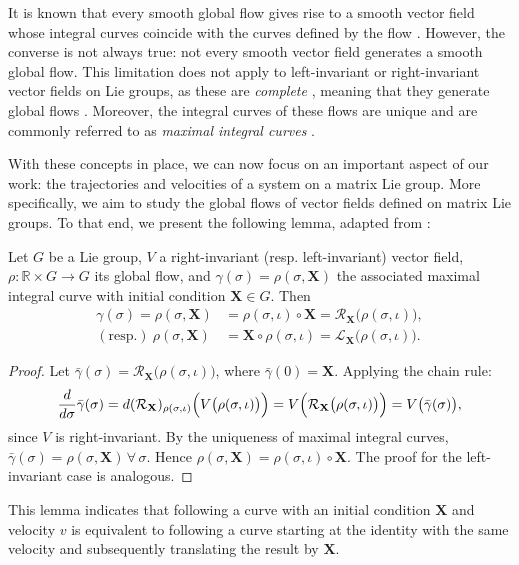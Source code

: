 It is known that every smooth global flow gives rise to a smooth vector field whose integral curves coincide with the curves defined by the flow \citep[p. 211]{Lee2012}. However, the converse is not always true: not every smooth vector field generates a smooth global flow. This limitation does not apply to left-invariant or right-invariant vector fields on Lie groups, as these are \emph{complete} \citep[p. 570]{Gallier2020}, meaning that they generate global flows \citep[p. 215]{Lee2012}. Moreover, the integral curves of these flows are unique \citep[p. 18]{Duistermaat2012} and are commonly referred to as \emph{maximal integral curves} \citep[p. 570]{Gallier2020}.

With these concepts in place, we can now focus on an important aspect of our work: the trajectories and velocities of a system on a matrix Lie group. More specifically, we aim to study the global flows of vector fields defined on matrix Lie groups. To that end, we present the following lemma, adapted from \citet[p. 570]{Gallier2020}:
\begin{lemma}\label{lemma:lie-group-flow}
    Let $G$ be a Lie group, $V$ a right-invariant (resp. left-invariant) vector field, $\rho:\mathbb{R}\times G\to G$ its global flow, and $\gamma(\sigma)=\rho(\sigma, \mathbf{X})$ the associated maximal integral curve with initial condition $\mathbf{X}\in G$. Then
    \begin{align*}
        \gamma(\sigma) = \rho(\sigma, \mathbf{X}) &=  \rho(\sigma, \iota)\circ\mathbf{X} = \mathcal{R}_\mathbf{X}\bigl(\rho(\sigma, \iota)\bigr),\\
        (\text{resp.})\ \rho(\sigma, \mathbf{X}) &=  \mathbf{X}\circ\rho(\sigma, \iota) = \mathcal{L}_\mathbf{X}\bigl(\rho(\sigma, \iota)\bigr).
    \end{align*}
\end{lemma}
\begin{proof}
    Let $\bar{\gamma}(\sigma) = \mathcal{R}_\mathbf{X}\bigl(\rho(\sigma, \iota)\bigr)$, where $\bar{\gamma}(0) = \mathbf{X}$. Applying the chain rule:
    \begin{align}
        \frac{d}{d\sigma}\bar{\gamma}(\sigma) = d(\mathcal{R}_{\mathbf{X}})_{\rho(\sigma, \iota)}\Bigl(V\bigl(\rho(\sigma, \iota)\bigr)\Bigr) = V\Bigl(\mathcal{R}_{\mathbf{X}}\bigl(\rho(\sigma, \iota)\bigr)\Bigr) = V\bigl(\bar{\gamma}(\sigma)\bigr),
    \end{align}
    since $V$ is right-invariant. By the uniqueness of maximal integral curves, $\bar{\gamma}(\sigma) = \rho(\sigma, \mathbf{X})\,\forall\, \sigma$. Hence $\rho(\sigma, \mathbf{X}) = \rho(\sigma, \iota)\circ\mathbf{X}$. The proof for the left-invariant case is analogous.
\end{proof}
This lemma indicates that following a curve with an initial condition $\mathbf{X}$ and velocity $v$ is equivalent to following a curve starting at the identity with the same velocity and subsequently translating the result by $\mathbf{X}$.


